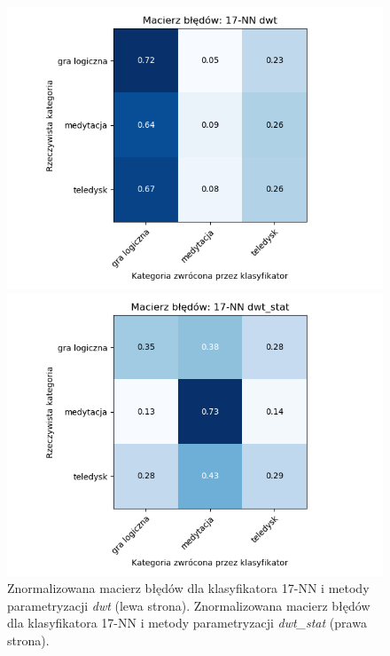 \documentclass[notitlepage]{report}
\begin{document}
\begin{figure}[H]
	\begin{minipage}{0.48\textwidth}
		\centering
		\includegraphics[width=1.3\linewidth]{17nn_dwt_cm.png}
	\end{minipage}
	\begin{minipage}{0.48\textwidth}
	\centering
	\includegraphics[width=1.3\linewidth]{17nn_dwt_2_cm.png}
	\end{minipage}
	\caption{Znormalizowana macierz błędów dla klasyfikatora 17-NN i metody parametryzacji \textit{dwt} (lewa strona). Znormalizowana macierz błędów dla klasyfikatora 17-NN i metody parametryzacji \textit{dwt\_stat} (prawa strona).}
\end{figure}
\end{document}
